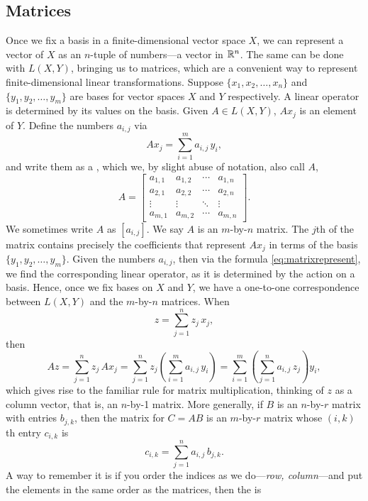 \subsection{Matrices}

Once we fix a basis in a finite-dimensional
vector space $X$, we can represent a vector of $X$ as an $n$-tuple of
numbers---a vector in ${\mathbb{R}}^n$.
The same can be done with $L(X,Y)$, bringing us to matrices,
which are a convenient way to represent
finite-dimensional linear transformations.
Suppose $\{ x_1, x_2, \ldots, x_n \}$ and $\{ y_1, y_2, \ldots, y_m \}$
are bases for vector spaces $X$ and $Y$ respectively.  A linear operator is 
determined by its values on the basis.  Given $A \in L(X,Y)$,
$A x_j$ is an element of $Y$.  Define the numbers
$a_{i,j}$ via
\begin{equation} \label{eq:matrixrepresent}
A x_j = \sum_{i=1}^m a_{i,j} \, y_i ,
\end{equation}
and write them as a \emph{},
which we, by slight abuse of notation, also call $A$,
\begin{equation*}
A =
\begin{bmatrix}
a_{1,1} & a_{1,2} & \cdots & a_{1,n} \\
a_{2,1} & a_{2,2} & \cdots & a_{2,n} \\
\vdots & \vdots & \ddots & \vdots \\
a_{m,1} & a_{m,2} & \cdots & a_{m,n}
\end{bmatrix} .
\end{equation*}
We sometimes write $A$ as $[a_{i,j}]$.
We say $A$ is an $m$-by-$n$ matrix.
The $j$th \emph{} of the matrix contains precisely the coefficients
that represent $A x_j$ in terms of the basis $\{ y_1,y_2,\ldots,y_m \}$.
Given the numbers $a_{i,j}$, then via the formula
\eqref{eq:matrixrepresent}, we find the corresponding linear operator,
as it is determined by the action on a basis.  Hence, once we fix
bases on $X$ and $Y$, we have a one-to-one correspondence between
$L(X,Y)$ and the $m$-by-$n$ matrices.
When
\begin{equation*}
z = \sum_{j=1}^n z_j \, x_j ,
\end{equation*}
then
\begin{equation*}
A z =
\sum_{j=1}^n z_j \, A x_j 
=
\sum_{j=1}^n z_j \left( \sum_{i=1}^m  a_{i,j}\, y_i \right) 
=
\sum_{i=1}^m \left(\sum_{j=1}^n  a_{i,j}\, z_j \right) y_i ,
\end{equation*}
which gives rise to the familiar rule for matrix multiplication,
thinking of $z$ as a column vector, that is, an $n$-by-1 matrix.
%
More generally, if $B$ is an $n$-by-$r$ matrix with entries $b_{j,k}$, then 
the matrix for $C = AB$ is an $m$-by-$r$ matrix whose $(i,k)$th entry
$c_{i,k}$ is
\begin{equation*}
c_{i,k} =
\sum_{j=1}^n a_{i,j}\,b_{j,k} .
\end{equation*}
A way to remember it is if you order the indices
as we do---\emph{row, column}---and
put the elements in the same order as the matrices,
then the  is 

